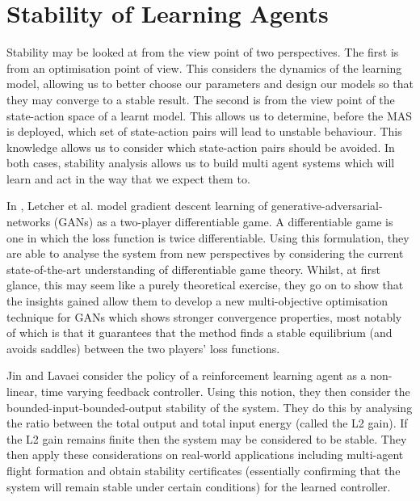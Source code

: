 \documentclass[preprint,11pt]{report}
\begin{document}
\section{Stability of Learning Agents}

Stability may be looked at from the view point of two perspectives. The first is from an
optimisation point of view. This considers the dynamics of the learning model, allowing us to better
choose our parameters and design our models so that they may converge to a stable result. The second
is from the view point of the state-action space of a learnt model. This allows us to determine,
before the MAS is deployed, which set of state-action pairs will lead to unstable behaviour. This
knowledge allows us to consider which state-action pairs should be avoided. In both cases, stability
analysis allows us to build multi agent systems which will learn and act in the way that we expect
them to.

In \cite{Letcher2019DifferentiableMechanics}, Letcher et al. model gradient descent learning of
generative-adversarial-networks (GANs) as a two-player differentiable game. A differentiable game is
one in which the loss function is twice differentiable. Using this formulation, they are able to
analyse the system from new perspectives by considering the current state-of-the-art understanding
of differentiable game theory. Whilst, at first glance, this may seem like a purely theoretical
exercise, they go on to show that the insights gained allow them to develop a new multi-objective
optimisation technique for GANs which shows stronger convergence properties, most notably of which
is that it guarantees that the method finds a stable equilibrium (and avoids saddles) between the
two players' loss functions.

Jin and Lavaei \cite{Jin2018Stability-certifiedPerspective} consider the policy of a reinforcement
learning agent as a non-linear, time varying feedback controller. Using this notion, they then
consider the bounded-input-bounded-output stability of the system. They do this by analysing the
ratio between the total output and total input energy (called the L2 gain). If the L2 gain remains
finite then the system may be considered to be stable. They then apply these considerations on
real-world applications including multi-agent flight formation and obtain stability certificates
(essentially confirming that the system will remain stable under certain conditions) for the learned
controller.
\end{document}
